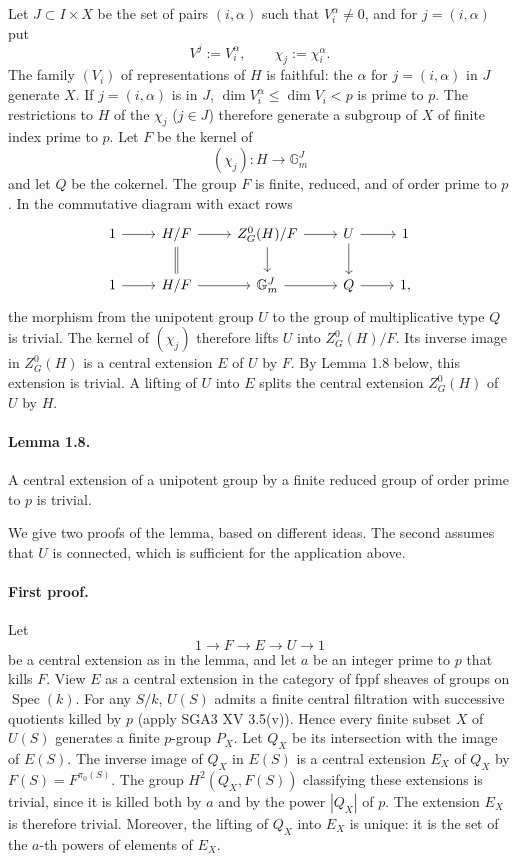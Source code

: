 \documentclass[11pt]{article}
\newcommand{\Gm}{\mathbb{G}_m}
\newcommand{\Spec}{\operatorname{Spec}}
\theoremstyle{plain}
\theoremstyle{definition}
\begin{document}
Let $J\subset I\times X$ be the set of pairs $(i,\alpha)$ such that $V^\alpha_i\ne0$, and for $j=(i,\alpha)$ put
\[
   V^j:=V^\alpha_i,\qquad \chi_j:=\chi^\alpha_i.
\]
The family $(V_i)$ of representations of $H$ is faithful: the $\alpha$ for $j=(i,\alpha)$ in $J$ generate $X$. If $j=(i,\alpha)$ is in $J$, $\dim V^\alpha_i\le \dim V_i<p$ is prime to $p$. The restrictions to $H$ of the $\chi_j$ ($j\in J$) therefore generate a subgroup of $X$ of finite index prime to $p$. Let $F$ be the kernel of
\[
   (\chi_j):H\longrightarrow \Gm^J
\]
and let $Q$ be the cokernel. The group $F$ is finite, reduced, and of order prime to $p$. In the commutative diagram with exact rows
\[
\begin{tikzcd}
1 \arrow[r] & H/F \arrow[r] \arrow[d,equal] & Z^0_G(H)/F \arrow[r] \arrow[d] & U \arrow[r] \arrow[d] & 1 \\
1 \arrow[r] & H/F \arrow[r] & \Gm^J \arrow[r] & Q \arrow[r] & 1,
\end{tikzcd}
\]
the morphism from the unipotent group $U$ to the group of multiplicative type $Q$ is trivial. The kernel of $(\chi_j)$ therefore lifts $U$ into $Z^0_G(H)/F$. Its inverse image in $Z^0_G(H)$ is a central extension $E$ of $U$ by $F$. By Lemma 1.8 below, this extension is trivial. A lifting of $U$ into $E$ splits the central extension $Z^0_G(H)$ of $U$ by $H$.

\paragraph{Lemma 1.8.} A central extension of a unipotent group by a finite reduced group of order prime to $p$ is trivial.

We give two proofs of the lemma, based on different ideas. The second assumes that $U$ is connected, which is sufficient for the application above.

\paragraph{First proof.} Let
\[
   1\longrightarrow F\longrightarrow E\longrightarrow U\longrightarrow 1
\]
be a central extension as in the lemma, and let $a$ be an integer prime to $p$ that kills $F$. View $E$ as a central extension in the category of fppf sheaves of groups on $\Spec(k)$. For any $S/k$, $U(S)$ admits a finite central filtration with successive quotients killed by $p$ (apply SGA3 XV 3.5(v)). Hence every finite subset $X$ of $U(S)$ generates a finite $p$-group $P_X$. Let $Q_X$ be its intersection with the image of $E(S)$. The inverse image of $Q_X$ in $E(S)$ is a central extension $E_X$ of $Q_X$ by $F(S)=F^{\pi_0(S)}$. The group $H^2(Q_X,F(S))$ classifying these extensions is trivial, since it is killed both by $a$ and by the power $|Q_X|$ of $p$. The extension $E_X$ is therefore trivial. Moreover, the lifting of $Q_X$ into $E_X$ is unique: it is the set of the $a$-th powers of elements of $E_X$.
\end{document}
